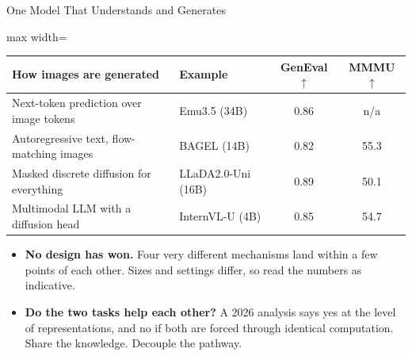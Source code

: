 \begin{frame}{One Model That Understands and Generates}
    \begin{center}
    \small
    \renewcommand{\arraystretch}{1.0}
    \begin{adjustbox}{max width=\linewidth}\begin{tabular}{>{\raggedright\arraybackslash}p{4.3cm}>{\raggedright\arraybackslash}p{3.4cm}cc}
        \toprule
        \textbf{How images are generated} & \textbf{Example} & \textbf{GenEval} $\uparrow$ & \textbf{MMMU} $\uparrow$ \\
        \midrule
        Next-token prediction over image tokens & Emu3.5 (34B) & 0.86 & n/a \\
        Autoregressive text, flow-matching images & BAGEL (14B) & 0.82 & 55.3 \\
        Masked discrete diffusion for everything & LLaDA2.0-Uni (16B) & 0.89 & 50.1 \\
        Multimodal LLM with a diffusion head & InternVL-U (4B) & 0.85 & 54.7 \\
        \bottomrule
    \end{tabular}\end{adjustbox}
    \end{center}
    \begin{itemize}\itemsep0.13em
        \item \textbf{No design has won.} Four very different mechanisms land within a few points of each other. Sizes and settings differ, so read the numbers as indicative.
        \item \textbf{Do the two tasks help each other?} A 2026 analysis says yes at the level of representations, and no if both are forced through identical computation. Share the knowledge. Decouple the pathway.
    \end{itemize}
\end{frame}

